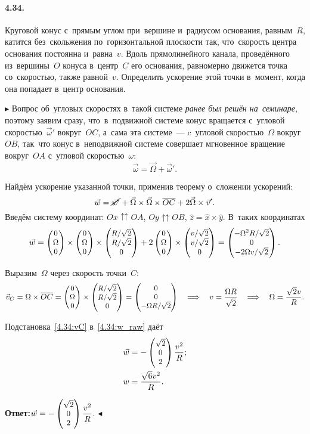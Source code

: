 \documentclass{weekly}
\begin{document}
\paragraph{4.34.} Круговой конус с~прямым углом при~вершине
и~радиусом основания, равным~$R$, катится без~скольжения
по~горизонтальной плоскости так, что~скорость центра основания
постоянна и~равна~$v$. Вдоль прямолинейного канала, проведённого
из~вершины~$O$ конуса в~центр~$C$ его основания, равномерно
движется точка со~скоростью, также равной~$v$. Определить
ускорение этой точки в~момент, когда она попадает в~центр основания.

$\blacktriangleright$ Вопрос об~угловых скоростях
в~такой системе \emph{ранее был решён на~семинаре,}
поэтому заявим сразу, что~в~подвижной системе
конус вращается с~угловой скоростью~$\vec\omega'$
вокруг~$OC$, а~сама эта системе~--- c~угловой скоростью~$\Omega$
вокруг~$OB$, так~что конус в~неподвижной системе
совершает мгновенное вращение вокруг~$OA$
с~угловой скоростью~$\omega$:
\begin{equation}
    \vec\omega = \vec\Omega + \vec\omega'.
\end{equation}

Найдём ускорение указанной точки, применив теорему о~сложении
ускорений:
\begin{equation}
    \vec w = \cancel{\vec w'} +
            \vec\Omega\times\vec\Omega\times\overline{OC}
            + 2\vec\Omega \times \vec v'.
\end{equation}
Введём систему координат: $Ox \upuparrows OA$, $Oy \upuparrows OB$,
$\hat z = \hat x \times \hat y$. В~таких координатах
\begin{equation}
    \vec w = \small\begin{pmatrix}0\\\Omega\\0\end{pmatrix} \times \small\begin{pmatrix}0\\\Omega\\0\end{pmatrix} \times
            \small\begin{pmatrix}R/\sqrt{2}\\R/\sqrt{2}\\0\end{pmatrix} +
            2 \small\begin{pmatrix}0\\\Omega\\0\end{pmatrix} \times
            \small\begin{pmatrix}v/\sqrt{2}\\v/\sqrt{2}\\0\end{pmatrix}
        = \small\begin{pmatrix}-\Omega^2 R/\sqrt{2}\\0\\-2\Omega v/\sqrt{2}\end{pmatrix}.
        \label{4.34:w_raw}
\end{equation}

Выразим~$\Omega$ через скорость точки~$C$:
\begin{equation}
    \vec v_C = \Omega \times \overline{OC}
        = \small\begin{pmatrix}0\\\Omega\\0\end{pmatrix} \times
            \small\begin{pmatrix}R/\sqrt{2}\\R/\sqrt{2}\\0\end{pmatrix}
        = \small\begin{pmatrix}0\\0\\-\Omega R/\sqrt{2}\end{pmatrix}
    \quad \Longrightarrow \quad
        v = \frac{\Omega R}{\sqrt{2}}
    \quad \Longrightarrow \quad
        \Omega = \frac{\sqrt{2}v}{R}. \label{4.34:vC}
\end{equation}

Подстановка~\eqref{4.34:vC} в~\eqref{4.34:w_raw} даёт
\begin{align}
    \vec w &= -\small\begin{pmatrix}\sqrt{2}\\0\\2\end{pmatrix} \frac{v^2}{R}; \\
    w &= \frac{\sqrt{6} v^2}{R}.
\end{align}

\textbf{Ответ:}\quad $\vec w = -\small\begin{pmatrix}\sqrt{2}\\0\\2\end{pmatrix} \dfrac{v^2}{R}$.
\hfill $\blacktriangleleft$
\end{document}
